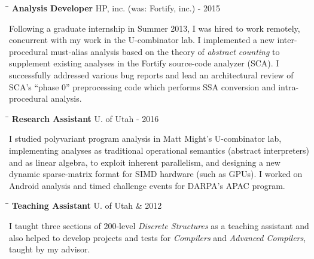 \documentclass[line]{res}
\begin{document}
\begin{resume}
   \vspace{-0.2cm}  
   \begin{tabbing}
    \hspace{2.25in}\= \hspace{2.25in}\= \kill %
    {\bf Analysis Developer} \>HP, inc. (was: Fortify, inc.)      - 2015
   \end{tabbing}\vspace{-0.5cm}      %
   Following a graduate internship in Summer 2013, I was hired to work remotely, concurrent with my work in the U-combinator lab.
   I implemented a new inter-procedural must-alias analysis based on the theory of \emph{abstract counting} to supplement existing analyses in the Fortify source-code analyzer (SCA).
   I successfully addressed various bug reports and lead an architectural review of SCA's ``phase 0'' preprocessing code which performs SSA conversion and intra-procedural analysis.
   \vspace{-0.2cm}  
   \begin{tabbing}
    \hspace{2.25in}\= \hspace{2.25in}\= \kill %
    {\bf Research Assistant} \>U. of Utah      - 2016
   \end{tabbing}\vspace{-0.5cm}      %
    I studied polyvariant program analysis in Matt Might's U-combinator lab, implementing analyses as
    traditional operational semantics (abstract interpreters) and as linear algebra, to exploit inherent parallelism, and designing a new dynamic sparse-matrix format for SIMD hardware (such as GPUs).
    I worked on Android analysis and timed challenge events for DARPA's APAC program. 
   \vspace{-0.2cm}  
   \begin{tabbing}
    \hspace{2.25in}\= \hspace{2.25in}\= \kill %
    {\bf Teaching Assistant} \>U. of Utah      \& 2012
   \end{tabbing}\vspace{-0.5cm}      %
    I taught three sections of 200-level \textit{Discrete Structures} as a teaching assistant and also helped to develop projects and tests for \textit{Compilers} and \textit{Advanced Compilers}, taught by my advisor.

\end{resume}
\end{document}
